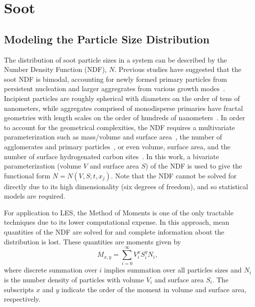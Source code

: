 \section{Soot}
\label{sec:lesmodels:soot}

\subsection{Modeling the Particle Size Distribution}
\label{sec:lesmodels:soot:ndf}

The distribution of soot particle sizes in a system can be described by the Number Density Function (NDF), $N$. Previous studies have suggested that the soot NDF is bimodal, accounting for newly formed primary particles from persistent nucleation and larger aggregrates from various growth modes~\cite{zhao2003,zhao2005,netzell2007}. Incipient particles are roughly spherical with diameters on the order of tens of nanometers, while aggregates comprised of monodisperse primaries have fractal geometries with length scales on the order of hundreds of nanometers~\cite{vanderwal1999}. In order to account for the geometrical complexities, the NDF requires a multivariate parameterization such as mass/volume and surface area~\cite{patterson2007,mueller2009,hmom2009}, the number of agglomerates and primary particles~\cite{park2004}, or even volume, surface area, and the number of surface hydrogenated carbon sites~\cite{blanquart2009}. In this work, a bivariate parameterization (volume $V$ and surface area $S$) of the NDF is used to give the functional form $N = N(V, S; t, x_j)$. Note that the NDF cannot be solved for directly due to its high dimensionality (six degrees of freedom), and so statistical models are required.

For application to LES, the Method of Moments is one of the only tractable techniques due to its lower computational expense. In this approach, mean quantities of the NDF are solved for and complete information about the distribution is lost. These quantities are moments given by
\begin{equation}\label{eq:lesmodels:soot:ndf:moments}
  M_{x,y} = \sum\limits_{i=0}^\infty V_i^x S_i^y N_i,
\end{equation}
where discrete summation over $i$ implies summation over all particles sizes and $N_i$ is the number density of particles with volume $V_i$ and surface area $S_i$. The subscripts $x$ and $y$ indicate the order of the moment in volume and surface area, respectively.

